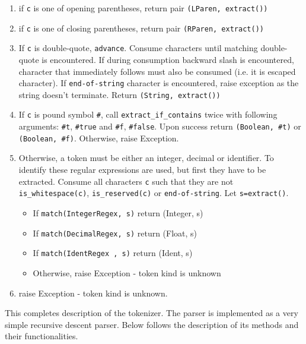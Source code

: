 \begin{itemize}
\begin{enumerate}
	\item
	if \texttt{c} is one of opening parentheses, return pair \texttt{(LParen, extract())}

	\item
	if \texttt{c} is one of closing parentheses, return pair \texttt{(RParen, extract())}

	\item
	If \texttt{c} is double-quote, \texttt{advance}. Consume characters until matching double-quote is encountered. If during consumption backward slash is encountered, character that immediately follows must also be consumed (i.e. it is escaped character). If \texttt{end-of-string} character is encountered, raise exception as the string doesn't terminate. Return \texttt{(String, extract())}

	\item
	If \texttt{c} is pound symbol \texttt{\#}, call \texttt{extract\_if\_contains} twice with following arguments: \texttt{\#t}, \texttt{\#true} and \texttt{\#f}, \texttt{\#false}. Upon success return \texttt{(Boolean, \#t)} or \texttt{(Boolean, \#f)}. Otherwise, raise Exception.

	\item
	Otherwise, a token must be either an integer, decimal or identifier. To identify these regular expressions are used, but first they have to be extracted. Consume all characters \texttt{c} such that they are not \texttt{is\_whitespace(c)}, \texttt{is\_reserved(c)} or \texttt{end-of-string}. Let \texttt{s=extract()}. 
	\begin{itemize}
		\item
		If \texttt{match(IntegerRegex, s)} return (Integer, s)
		\item
		If \texttt{match(DecimalRegex, s)} return (Float, s)
		\item
		If \texttt{match(IdentRegex  , s)} return (Ident, s)
		\item
		Otherwise, raise Exception - token kind is unknown


	\end{itemize}
	\item
	raise Exception - token kind is unknown.
\end{enumerate}
\end{itemize}

This completes description of the tokenizer. The parser is implemented as a very simple recursive descent parser. Below follows the description of its methods and their functionalities.

